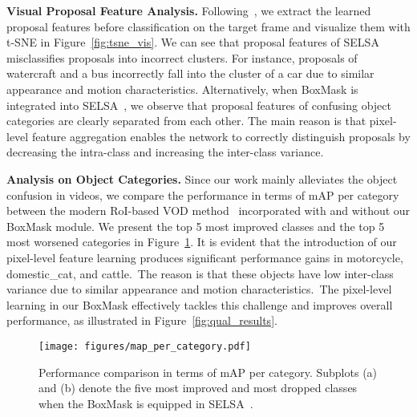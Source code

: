 \documentclass[10pt,twocolumn,letterpaper]{article}
\begin{document}
\vspace{3pt}
\noindent \textbf{Visual Proposal Feature Analysis.}
\label{sec:vis_features_anlysis}
Following~\cite{han2020mining}, we extract the learned proposal features before classification on the target frame and visualize them with t-SNE in Figure~\ref{fig:tsne_vis}. We can see that proposal features of SELSA misclassifies proposals into incorrect clusters. For instance, proposals of watercraft and a bus incorrectly fall into the cluster of a car due to similar appearance and motion characteristics. Alternatively, when BoxMask is integrated into SELSA~\cite{wu2019sequence}, we observe that proposal features of confusing object categories are clearly separated from each other. The main reason is that pixel-level feature aggregation enables the network to correctly distinguish proposals by decreasing the intra-class and increasing the inter-class variance. 

\vspace{3pt}
\noindent \textbf{Analysis on Object Categories.}
Since our work mainly alleviates the object confusion in videos, we compare the performance in terms of mAP per category between the modern RoI-based VOD method~\cite{wu2019sequence} incorporated with and without our BoxMask module. We present the top 5 most improved classes and the top 5 most worsened categories in Figure~\ref{fig:map_per_class}. It is evident that the introduction of our pixel-level feature learning produces significant performance gains in {motorcycle}, {domestic\_cat}, and {cattle}.~The reason is that these objects have low inter-class variance due to similar appearance and motion characteristics.~The pixel-level learning in our BoxMask effectively tackles this challenge and improves overall performance, as illustrated in Figure~\ref{fig:qual_results}.

\begin{figure}
\begin{center}
\texttt{[image: figures/map\_per\_category.pdf]}
\caption{Performance comparison in terms of mAP per category. Subplots (a) and (b) denote the five most improved and most dropped classes when the BoxMask is equipped in SELSA~\cite{wu2019sequence}.}
\label{fig:map_per_class}
\end{center}
\vspace{-20pt}
\end{figure}
\end{document}
